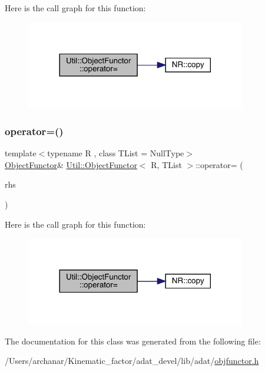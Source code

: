 Here is the call graph for this function\+:
\nopagebreak
\begin{figure}[H]
\begin{center}
\leavevmode
\includegraphics[width=272pt]{d3/de7/classUtil_1_1ObjectFunctor_a90395c8be24965e154bee2f7813a78e8_cgraph}
\end{center}
\end{figure}
\mbox{\label{classUtil_1_1ObjectFunctor_a90395c8be24965e154bee2f7813a78e8}} 
\subsubsection{\texorpdfstring{operator=()}{operator=()}\hspace{0.1cm}{\footnotesize\ttfamily [2/2]}}
{\footnotesize\ttfamily template$<$typename R , class T\+List  = Null\+Type$>$ \\
\mbox{\hyperlink{classUtil_1_1ObjectFunctor}{Object\+Functor}}\& \mbox{\hyperlink{classUtil_1_1ObjectFunctor}{Util\+::\+Object\+Functor}}$<$ R, T\+List $>$\+::operator= (\begin{DoxyParamCaption}\item[{const \mbox{\hyperlink{classUtil_1_1ObjectFunctor}{Object\+Functor}}$<$ R, T\+List $>$ \&}]{rhs }\end{DoxyParamCaption})\hspace{0.3cm}{\ttfamily [inline]}}

Here is the call graph for this function\+:
\nopagebreak
\begin{figure}[H]
\begin{center}
\leavevmode
\includegraphics[width=272pt]{d3/de7/classUtil_1_1ObjectFunctor_a90395c8be24965e154bee2f7813a78e8_cgraph}
\end{center}
\end{figure}


The documentation for this class was generated from the following file\+:\begin{DoxyCompactItemize}
\item 
/\+Users/archanar/\+Kinematic\+\_\+factor/adat\+\_\+devel/lib/adat/\mbox{\hyperlink{lib_2adat_2objfunctor_8h}{objfunctor.\+h}}\end{DoxyCompactItemize}
